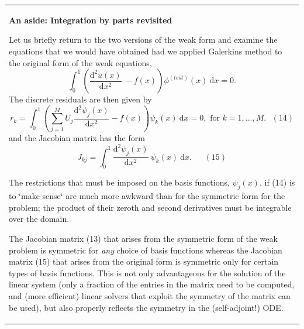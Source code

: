 \begin{center} \tabulinesep=1mm
\begin{longtabu} spread 0pt [c]{*{1}{|X[-1]}|}
\hline
\begin{center} {\bfseries  An aside\+: Integration by parts revisited }\end{center} 

Let us briefly return to the two versions of the weak form and examine the equations that we would have obtained had we applied Galerkin\textquotesingle{}s method to the original form of the weak equations, \[ \int_0^1 \left( \frac{\mbox{d}^2 u(x)}{\mbox{d}x^2} \ - f(x) \right) \phi^{(test)}(x) \ \mbox{d}x = 0. \] The discrete residuals are then given by \[ r_k = \int_0^1 \left( \sum_{j=1}^{M} U_{j} \frac{\mbox{d}^2 \psi_j(x)}{\mbox{d} x^2} - f(x) \right) \psi_k(x) \ \mbox{d}x = 0, \mbox{\ \ \ \ \ \ for $k=1,...,M.$\ \ \ \ \ \ } (14) \] and the Jacobian matrix has the form \[ J_{kj} = \int_0^1\frac{\mbox{d}^2 \psi_j(x)}{\mbox{d} x^2} \ \psi_k(x)\ \mbox{d}x. \ \ \ \ \ \ \ (15) \]
\begin{DoxyItemize}
\item The restrictions that must be imposed on the basis functions, $ \psi_j(x) $, if (14) is to \char`\"{}make sense\char`\"{} are much more awkward than for the symmetric form for the problem; the product of their zeroth and second derivatives must be integrable over the domain.
\item The Jacobian matrix (13) that arises from the symmetric form of the weak problem is symmetric for {\itshape any} choice of basis functions whereas the Jacobian matrix (15) that arises from the original form is symmetric only for certain types of basis functions. This is not only advantageous for the solution of the linear system (only a fraction of the entries in the matrix need to be computed, and (more efficient) linear solvers that exploit the symmetry of the matrix can be used), but also properly reflects the symmetry in the (self-\/adjoint!) O\+DE.
\end{DoxyItemize}   \\
\end{longtabu}
\end{center} 



 

